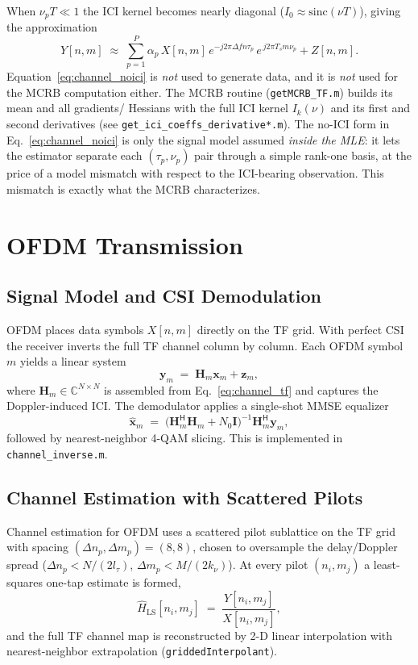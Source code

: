 \documentclass[11pt,a4paper]{article}
\newcommand{\deltaf}{\Delta f}
\begin{document}
When $\nu_p T \ll 1$ the ICI kernel becomes nearly diagonal
($I_0 \approx \mathrm{sinc}(\nu T)$), giving the approximation
\begin{equation}
  Y[n,m] \;\approx\; \sum_{p=1}^{P}\alpha_p\, X[n,m]\,
  e^{-j2\pi \deltaf n \tau_p}\, e^{\,j2\pi T_s m \nu_p} + Z[n,m].
  \label{eq:channel_noici}
\end{equation}
Equation~\eqref{eq:channel_noici} is \emph{not} used to generate data,
and it is \emph{not} used for the MCRB computation either. The MCRB
routine (\texttt{getMCRB\_TF.m}) builds its mean and all gradients/
Hessians with the full ICI kernel $I_k(\nu)$ and its first and second
derivatives (see \texttt{get\_ici\_coeffs\_derivative*.m}). The
no-ICI form in Eq.~\eqref{eq:channel_noici} is only the signal model
assumed \emph{inside the MLE}: it lets the estimator separate each
$(\tau_p,\nu_p)$ pair through a simple rank-one basis, at the price of
a model mismatch with respect to the ICI-bearing observation. This
mismatch is exactly what the MCRB characterizes.

\section{OFDM Transmission}

\subsection{Signal Model and CSI Demodulation}
OFDM places data symbols $X[n,m]$ directly on the TF grid. With perfect
CSI the receiver inverts the full TF channel column by column. Each
OFDM symbol $m$ yields a linear system
\begin{equation}
  \mathbf{y}_m \;=\; \mathbf{H}_m\mathbf{x}_m + \mathbf{z}_m,
\end{equation}
where $\mathbf{H}_m \in \mathbb{C}^{N\times N}$ is assembled from
Eq.~\eqref{eq:channel_tf} and captures the Doppler-induced ICI. The
demodulator applies a single-shot MMSE equalizer
\begin{equation}
  \hat{\mathbf{x}}_m \;=\;
  \bigl(\mathbf{H}_m^{\mathsf H}\mathbf{H}_m + N_0\mathbf{I}\bigr)^{-1}
  \mathbf{H}_m^{\mathsf H}\mathbf{y}_m,
\end{equation}
followed by nearest-neighbor 4-QAM slicing. This is implemented in
\texttt{channel\_inverse.m}.

\subsection{Channel Estimation with Scattered Pilots}
Channel estimation for OFDM uses a scattered pilot sublattice on the TF
grid with spacing $(\Delta n_p, \Delta m_p) = (8,8)$, chosen to
oversample the delay/Doppler spread
($\Delta n_p < N/(2 l_\tau)$, $\Delta m_p < M/(2 k_\nu)$). At every
pilot $(n_i,m_j)$ a least-squares one-tap estimate is formed,
\begin{equation}
  \hat H_{\mathrm{LS}}[n_i,m_j] \;=\;
  \frac{Y[n_i,m_j]}{X[n_i,m_j]},
\end{equation}
and the full TF channel map is reconstructed by 2-D linear
interpolation with nearest-neighbor extrapolation
(\texttt{griddedInterpolant}).
\end{document}
